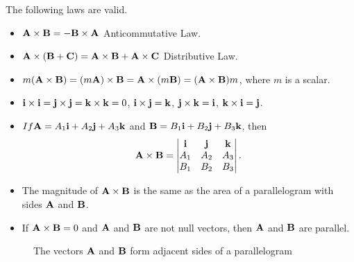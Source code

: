 \documentclass[titlepage,a4paper,12pt]{report}
\begin{document}
\noindent The following laws are valid.
\begin{itemize}
\item[(i)] ${\bf{A}\times \bf{B}}={-\bf{B}\times \bf{A}}$ \quad Anticommutative Law.
\item[(ii)] ${\bf{A}\times (\bf{B}+\bf{C})}={\bf{A}\times \bf{B}}+{\bf{A}\times \bf{C}}$ \quad Distributive Law.
\item[(iii)] $m({\bf{A}\times \bf{B}})=(m{\bf{A}})\times {\bf{B}}={\bf{A}}\times (m{\bf{B}})=({\bf{A\times \bf{B}}})m$, where $m$ is a scalar.
\item[(iv)] ${\bf{i}}\times {\bf{i}}={\bf{j}}\times {\bf{j}}={\bf{k}}\times {\bf{k}}=0$, ${\bf{i}}\times {\bf{j}}={\bf{k}}$, ${\bf{j}}\times {\bf{k}}={\bf{i}}$, ${\bf{k}}\times {\bf{i}}={\bf{j}}$.
\item[(v)] $If {\bf{A}}=A_1{\bf{i}}+A_2{\bf{j}}+A_3{\bf{k}}$ and ${\bf{B}}=B_1{\bf{i}}+B_2{\bf{j}}+B_3{\bf{k}}$, then 
\[{\bf{A}\times \bf{B}}=\begin{vmatrix}
{\bf{i}} & {\bf{j}} & {\bf{k}}\\
A_1 & A_2 & A_3 \\
B_1 & B_2 & B_3 
\end{vmatrix}.\]
\item[(vi)] The magnitude of ${\bf{A}\times \bf{B}}$ is the same as the area of a parallelogram with sides ${\bf{A}}$ and ${\bf{B}}$.
\item[(vii)] If ${\bf{A}\times \bf{B}}=0$ and ${\bf{A}}$ and ${\bf{B}}$ are not null vectors, then ${\bf{A}}$ and ${\bf{B}}$ are parallel.
\end{itemize} 
\begin{figure}[h!]

\caption{The vectors ${{\bf{A}}}$ and ${\bf{B}}$ form adjacent sides of a parallelogram}
\end{figure}
\end{document}
